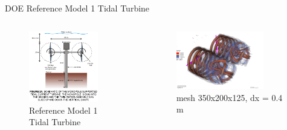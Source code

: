 \documentclass[xcolor=x11names,compress]{beamer}
\begin{document}
	\begin{frame}{DOE Reference Model 1 Tidal Turbine}
		
		\begin{columns}
		    
		    \begin{column}{0.6\textwidth}
		        \begin{figure}[p]
				    \centering
				    \includegraphics[width=0.8\textwidth]{figures/DOE-Reference-Model-1-Full-Scale-dual-rotor.PNG}
				    \caption{\scriptsize{Reference Model 1 Tidal Turbine}}
				\end{figure}

		    \end{column}
		    
		    \begin{column}{0.6\textwidth}
		        \begin{figure}[p]
				    \centering
				    \includegraphics[width=0.8\textwidth]{figures/fastFlume__dual-rotor-mesh=TunedMedium.png}
				    \caption{\scriptsize{mesh 350x200x125, dx = 0.4 m}}
				\end{figure}

		    \end{column}

		\end{columns}

	\end{frame}
\end{document}
